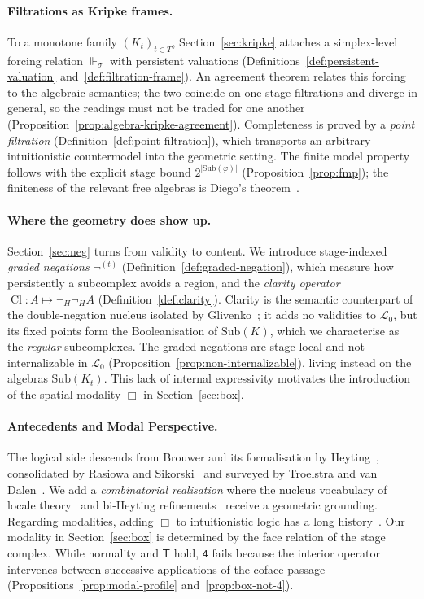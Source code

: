 \documentclass[final,12pt]{elsarticle}
\theoremstyle{plain}
\theoremstyle{definition}
\begin{document}
\paragraph{Filtrations as Kripke frames.}
To a monotone family $(K_t)_{t \in T}$, Section~\ref{sec:kripke} attaches a
simplex-level forcing relation $\Vdash_\sigma$ with persistent valuations
(Definitions~\ref{def:persistent-valuation}
and~\ref{def:filtration-frame}). An agreement theorem relates this forcing to
the algebraic semantics; the two coincide on one-stage filtrations and diverge
in general, so the readings must not be traded for one another
(Proposition~\ref{prop:algebra-kripke-agreement}). Completeness is proved by a
\emph{point filtration} (Definition~\ref{def:point-filtration}), which
transports an arbitrary intuitionistic countermodel into the geometric
setting. The finite model property follows with the explicit stage bound
$2^{|\mathrm{Sub}(\varphi)|}$ (Proposition~\ref{prop:fmp}); the finiteness of the
relevant free algebras is Diego's theorem~\cite{diego1966,chagrovzakharyaschev1997}.

\paragraph{Where the geometry does show up.}
Section~\ref{sec:neg} turns from validity to content. We introduce
stage-indexed \emph{graded negations} $\neg^{(t)}$
(Definition~\ref{def:graded-negation}), which measure how persistently a
subcomplex avoids a region, and the \emph{clarity operator}
$\mathop{\mathrm{Cl}} \colon A \mapsto \neg_H \neg_H A$
(Definition~\ref{def:clarity}). Clarity is the semantic counterpart of the
double-negation nucleus isolated by Glivenko~\cite{glivenko1929}; it adds no
validities to $\mathcal{L}_0$, but its fixed points form the Booleanisation of
$\mathrm{Sub}(K)$, which we characterise as the \emph{regular} subcomplexes.
The graded negations are stage-local and not internalizable in $\mathcal{L}_0$
(Proposition~\ref{prop:non-internalizable}), living instead on the algebras
$\mathrm{Sub}(K_t)$. This lack of internal expressivity motivates the
introduction of the spatial modality $\Box$ in Section~\ref{sec:box}.

\paragraph{Antecedents and Modal Perspective.}
The logical side descends from Brouwer and its formalisation by
Heyting~\cite{heyting1930}, consolidated by Rasiowa and
Sikorski~\cite{rasiowasikorski1963} and surveyed by Troelstra and van
Dalen~\cite{troelstravandalen1988}. We add a \emph{combinatorial realisation}
where the nucleus vocabulary of locale theory~\cite{johnstone1982} and bi-Heyting
refinements~\cite{lawvere1991,reyeszolfaghari1996} receive a geometric
grounding. Regarding modalities, adding $\Box$ to intuitionistic logic
has a long history~\cite{ono1977,bozicdosen1984}. Our modality in
Section~\ref{sec:box} is determined by the face relation of the stage complex.
While normality and $\mathsf{T}$ hold, $\mathsf{4}$ fails because the interior
operator intervenes between successive applications of the coface passage
(Propositions~\ref{prop:modal-profile} and~\ref{prop:box-not-4}).
\end{document}
